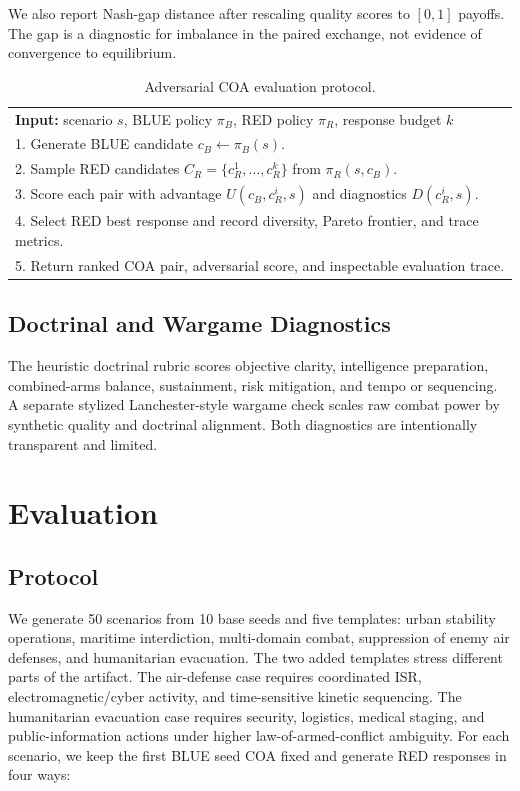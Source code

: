 \documentclass[sigconf]{acmart}
\begin{document}
We also report Nash-gap distance after rescaling quality scores to $[0,1]$ payoffs. The gap is a diagnostic for imbalance in the paired exchange, not evidence of convergence to equilibrium.

\begin{table}[t]
\caption{Adversarial COA evaluation protocol.}
\label{tab:algorithm}
\small
\begin{tabular}{@{}p{.96\linewidth}@{}}
\toprule
\textbf{Input:} scenario $s$, BLUE policy $\pi_B$, RED policy $\pi_R$, response budget $k$ \\
1. Generate BLUE candidate $c_B \leftarrow \pi_B(s)$. \\
2. Sample RED candidates $C_R=\{c_R^1,\ldots,c_R^k\}$ from $\pi_R(s,c_B)$. \\
3. Score each pair with advantage $U(c_B,c_R^i,s)$ and diagnostics $D(c_R^i,s)$. \\
4. Select RED best response and record diversity, Pareto frontier, and trace metrics. \\
5. Return ranked COA pair, adversarial score, and inspectable evaluation trace. \\
\bottomrule
\end{tabular}
\end{table}

\subsection{Doctrinal and Wargame Diagnostics}

The heuristic doctrinal rubric scores objective clarity, intelligence preparation, combined-arms balance, sustainment, risk mitigation, and tempo or sequencing. A separate stylized Lanchester-style wargame check scales raw combat power by synthetic quality and doctrinal alignment. Both diagnostics are intentionally transparent and limited.

\section{Evaluation}

\subsection{Protocol}

We generate 50 scenarios from 10 base seeds and five templates: urban stability operations, maritime interdiction, multi-domain combat, suppression of enemy air defenses, and humanitarian evacuation. The two added templates stress different parts of the artifact. The air-defense case requires coordinated ISR, electromagnetic/cyber activity, and time-sensitive kinetic sequencing. The humanitarian evacuation case requires security, logistics, medical staging, and public-information actions under higher law-of-armed-conflict ambiguity. For each scenario, we keep the first BLUE seed COA fixed and generate RED responses in four ways:
\end{document}
